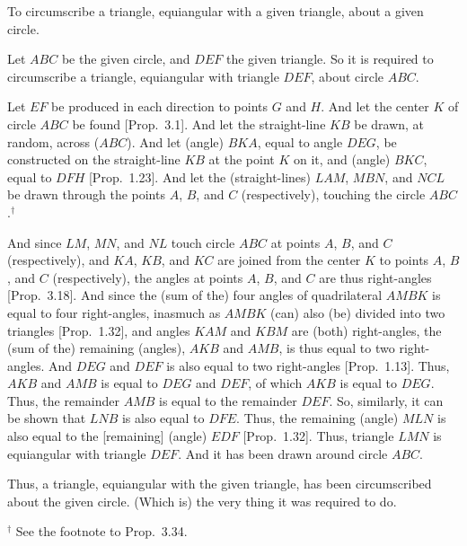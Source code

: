 \begin{Parallel}{}{}
{To circumscribe a triangle, equiangular with a given triangle, about a given
circle.

\epsfysize=1.8in
\centerline{}

Let $ABC$ be the given circle, and $DEF$ the given triangle. So it is required
to circumscribe a triangle, equiangular with triangle  $DEF$, about circle $ABC$.

Let $EF$ be produced in each direction to points $G$ and 
$H$. And
let the center $K$ of circle $ABC$ be found [Prop.~3.1].
And let the straight-line $KB$ be drawn, at random,  across ($ABC$).
And let (angle) $BKA$, equal to angle $DEG$, be constructed on the straight-line $KB$ at the point $K$ on it, and (angle) $BKC$, equal to
$DFH$ [Prop.~1.23]. And let the (straight-lines) $LAM$, $MBN$, and $NCL$ be 
drawn through the points $A$, $B$, and $C$ (respectively), touching the circle $ABC$.$^\dag$

And since $LM$, $MN$, and $NL$ touch circle $ABC$ at points $A$, $B$, and $C$
(respectively), and $KA$, $KB$, and $KC$ are joined from the center $K$
to  points $A$, $B$, and $C$ (respectively), the angles at points
$A$, $B$, and $C$ are thus right-angles [Prop.~3.18]. And
since the (sum of the) four angles of quadrilateral $AMBK$ is equal to
four right-angles,
inasmuch as $AMBK$ (can) also (be) divided into two triangles [Prop.~1.32],
and angles $KAM$ and $KBM$ are (both) right-angles, the (sum of the) remaining (angles), $AKB$ and $AMB$, is thus equal to two right-angles. 
And $DEG$ and $DEF$ is also equal to two right-angles [Prop.~1.13].
Thus, $AKB$ and $AMB$ is equal to $DEG$ and $DEF$, of which $AKB$ is
equal to $DEG$. Thus, the remainder $AMB$ is equal to the remainder $DEF$.
So, similarly, it can be shown that $LNB$ is also equal to $DFE$. Thus, the
remaining (angle) $MLN$ is also equal to the [remaining] (angle) $EDF$ [Prop.~1.32]. Thus,
triangle $LMN$ is equiangular with triangle $DEF$. And it has been drawn around
circle $ABC$.

Thus,  a triangle, equiangular with  the given triangle, has been circumscribed about the given
circle. (Which is) the very thing it was required to do.}
\end{Parallel}
{\footnotesize \noindent$^\dag$ See the footnote
to Prop.~3.34.}

